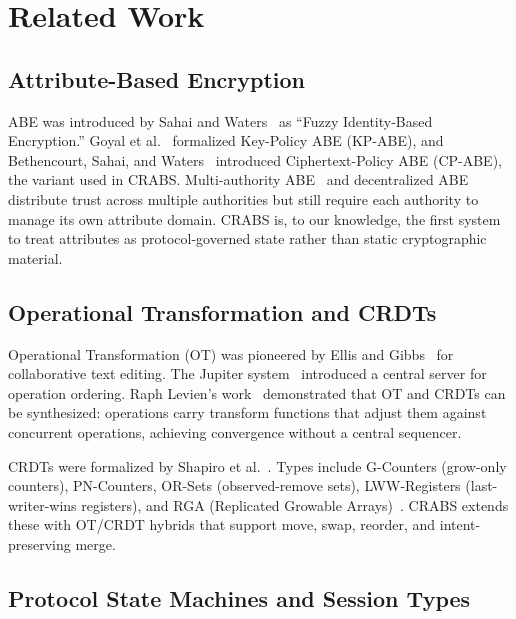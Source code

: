 \documentclass[11pt,a4paper]{article}
\begin{document}
\section{Related Work}

\subsection{Attribute-Based Encryption}

ABE was introduced by Sahai and Waters~\cite{sahai2005fuzzy} as ``Fuzzy Identity-Based Encryption.'' Goyal et al.~\cite{goyal2006abe} formalized Key-Policy ABE (KP-ABE), and Bethencourt, Sahai, and Waters~\cite{bethencourt2007cpabe} introduced Ciphertext-Policy ABE (CP-ABE), the variant used in CRABS. Multi-authority ABE~\cite{chase2007multi} and decentralized ABE~\cite{lewko2011decentralizing} distribute trust across multiple authorities but still require each authority to manage its own attribute domain. CRABS is, to our knowledge, the first system to treat attributes as protocol-governed state rather than static cryptographic material.

\subsection{Operational Transformation and CRDTs}

Operational Transformation (OT) was pioneered by Ellis and Gibbs~\cite{ellis1989ot} for collaborative text editing. The Jupiter system~\cite{nichols1995jupiter} introduced a central server for operation ordering. Raph Levien's work~\cite{levien2016synthesis} demonstrated that OT and CRDTs can be synthesized: operations carry transform functions that adjust them against concurrent operations, achieving convergence without a central sequencer.

CRDTs were formalized by Shapiro et al.~\cite{shapiro2011crdt}. Types include G-Counters (grow-only counters), PN-Counters, OR-Sets (observed-remove sets), LWW-Registers (last-writer-wins registers), and RGA (Replicated Growable Arrays)~\cite{levien2016rga}. CRABS extends these with OT/CRDT hybrids that support move, swap, reorder, and intent-preserving merge.

\subsection{Protocol State Machines and Session Types}
\end{document}

